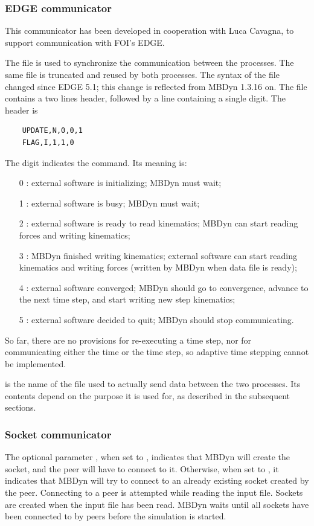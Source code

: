 \subsubsection{EDGE communicator}
This communicator has been developed in cooperation with Luca Cavagna,
to support communication with FOI's EDGE.

The file  is used to synchronize the communication
between the processes.
The same file is truncated and reused by both processes.
The syntax of the file changed since EDGE 5.1; this change is reflected
from MBDyn 1.3.16 on.
The file contains a two lines header, followed by a line containing a single digit.
The header is
\begin{verbatim}
    UPDATE,N,0,0,1
    FLAG,I,1,1,0
\end{verbatim}
The digit indicates the command.  Its meaning is:
\begin{itemize}
\item[0 :] external software is initializing; MBDyn must wait;
\item[1 :] external software is busy; MBDyn must wait;
\item[2 :] external software is ready to read kinematics; MBDyn can start reading forces and writing kinematics;
\item[3 :] MBDyn finished writing kinematics; external software can start reading kinematics and writing forces
	(written by MBDyn when data file is ready);
\item[4 :] external software converged; MBDyn should go to convergence, advance to the next time step,
and start writing new step kinematics;
\item[5 :] external software decided to quit; MBDyn should stop communicating.
\end{itemize}
So far, there are no provisions for re-executing a time step,
nor for communicating either the time or the time step,
so adaptive time stepping cannot be implemented.

 is the name of the file used to actually send data
between the two processes.
Its contents depend on the purpose it is used for,
as described in the subsequent sections.



\subsubsection{Socket communicator}
\label{sec:el:forces:comm:socket}
The optional parameter , when set to , indicates
that MBDyn will create the socket, and the peer will have to connect to it.
Otherwise, when set to , it indicates that MBDyn will try to connect
to an already existing socket created by the peer.
Connecting to a peer is attempted while reading the input file.
Sockets are created when the input file has been read.
MBDyn waits until all sockets have been connected to by peers
before the simulation is started.

